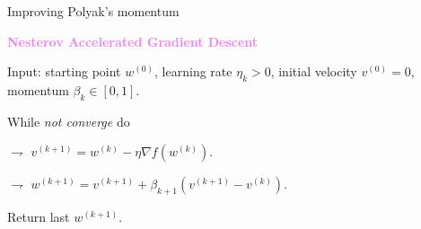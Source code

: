 \documentclass[9pt]{beamer}
\newcommand\citem[1]{{\scriptsize[\citetitle{#1}, \cite{#1}]}}
\begin{document}
%	
%
%
%
%
%
%	
%
%
%
%
%
%
%
%
%
%
%
%
%
%
%

\begin{frame}{Improving Polyak's momentum}

\textbf{\textcolor{violet}{Nesterov Accelerated Gradient Descent}}

\vspace{.3cm}

\alert{Input}: starting point $w^{(0)}$, learning rate $\eta_k > 0$, initial velocity $v^{(0)}=0$, momentum $\beta_k \in [0,1]$.

\vspace{.3cm}

While \emph{not converge} do    

$\rightharpoondown$ $v^{(k+1)} = w^{(k)} - \eta \nabla f (w^{(k)})$.

$\rightharpoondown$ $w^{(k+1)} = v^{(k+1)} + \beta_{k+1}( v^{(k+1)} - v^{(k)})$.

\vspace{.3cm}

\alert{Return} last $w^{(k+1)}$.


\end{frame}
\end{document}
